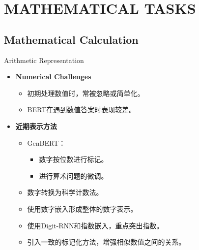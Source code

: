 \section{MATHEMATICAL TASKS}
\subsection{Mathematical Calculation}
\begin{frame}{Arithmetic Representation}
	\begin{itemize}
		\item \textbf{Numerical Challenges}
		      \begin{itemize}
			      \item 初期处理数值时，常被忽略或简单化。
			      \item BERT在遇到数值答案时表现较差。
		      \end{itemize}
		      \pause
		\item \textbf{近期表示方法}
		      \begin{itemize}
			      \item GenBERT：
			            \begin{itemize}
				            \item 数字按位数进行标记。
				            \item 进行算术问题的微调。
			            \end{itemize}
			      \item 数字转换为科学计数法。
			      \item 使用数字嵌入形成整体的数字表示。
			      \item 使用Digit-RNN和指数嵌入，重点突出指数。
			      \item 引入一致的标记化方法，增强相似数值之间的关系。
		      \end{itemize}
	\end{itemize}
\end{frame}

